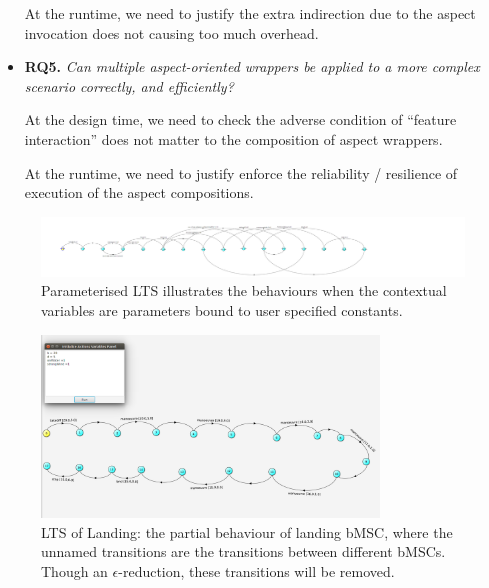\begin{itemize}
At the runtime, we need to justify the extra indirection due to the aspect invocation does not causing too much overhead.

\item {\bf RQ5.} {\em Can multiple aspect-oriented wrappers be applied to a more complex scenario correctly, and efficiently? }

At the design time, we need to check the adverse condition of ``feature interaction'' does not matter to the composition of aspect wrappers.

At the runtime, we need to justify enforce the reliability / resilience of execution of the aspect compositions. 
\end{itemize}
\begin{figure}
 \includegraphics[width=\textwidth]{figures/3-parameterized-LTS.png}
    \caption{Parameterised LTS illustrates the behaviours when the contextual variables are parameters bound to user specified constants. }
    \label{fig:pLTS}
    \vspace*{-0.25cm}
\end{figure}

\begin{figure}
 \includegraphics[width=0.8\textwidth]{figures/4-Land-final-LTS.png}
    \caption{LTS of Landing: the partial behaviour of landing bMSC, where the unnamed transitions are the transitions between different bMSCs. Though an $\epsilon$-reduction, these transitions will be removed.}
    \label{fig:landing}
    \vspace*{-0.25cm}
\end{figure}

